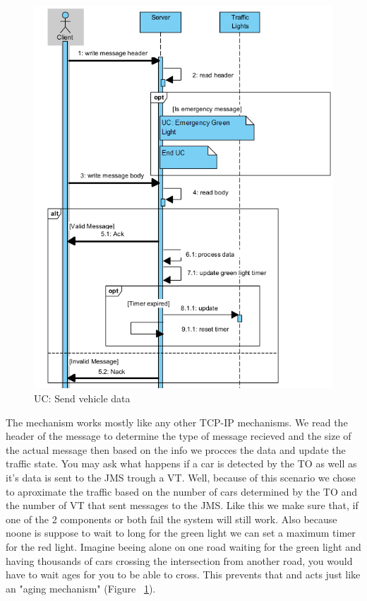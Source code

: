 \documentclass[17pt]{report}
\begin{document}
\begin{figure}[h!]
    \includegraphics[width=\textwidth]{UC/SendVehicleData.png}
    \caption{UC: Send vehicle data}
    \label{fig:UC_SendVehicleData}
\end{figure}

The mechanism works mostly like any other TCP-IP mechanisms.
We read the header of the message to determine the type of 
message recieved and the size of the actual message then
based on the info we procces the data and update the traffic 
state. You may ask what happens if a car is detected by the 
TO as well as it's data is sent to the JMS trough a VT.
Well, because of this scenario we chose to aproximate the 
traffic based on the number of cars determined by the TO 
and the number of VT that sent messages to the JMS. Like this
we make sure that, if one of the 2 components or both fail the system
will still work. Also because noone is suppose to wait to long
for the green light we can set a maximum timer for the red light.
Imagine beeing alone on one road waiting for the green light and
having thousands of cars crossing the intersection from another road,
you would have to wait ages for you to be able to cross. This prevents that
and acts just like an "aging mechanism" (Figure ~\ref{fig:UC_SendVehicleData}).
\end{document}
